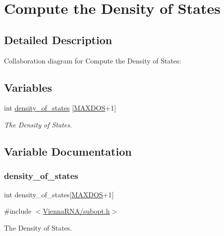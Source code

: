 \hypertarget{group__dos}{}\section{Compute the Density of States}
\label{group__dos}


\subsection{Detailed Description}
Collaboration diagram for Compute the Density of States\+:
\subsection*{Variables}
\begin{DoxyCompactItemize}
\item 
int \mbox{\hyperlink{group__dos_ga937634a76b46a22530a74906f1957a9e}{density\+\_\+of\+\_\+states}} \mbox{[}\mbox{\hyperlink{subopt_8h_a5ec740b80afb4906ba4311dbd8ddbd89}{M\+A\+X\+D\+OS}}+1\mbox{]}
\begin{DoxyCompactList}\small\item\em The Density of States. \end{DoxyCompactList}\end{DoxyCompactItemize}


\subsection{Variable Documentation}
\mbox{\label{group__dos_ga937634a76b46a22530a74906f1957a9e}} 
\subsubsection{\texorpdfstring{density\_of\_states}{density\_of\_states}}
{\footnotesize\ttfamily int density\+\_\+of\+\_\+states\mbox{[}\mbox{\hyperlink{subopt_8h_a5ec740b80afb4906ba4311dbd8ddbd89}{M\+A\+X\+D\+OS}}+1\mbox{]}}



{\ttfamily \#include $<$\mbox{\hyperlink{subopt_8h}{Vienna\+R\+N\+A/subopt.\+h}}$>$}



The Density of States. 

